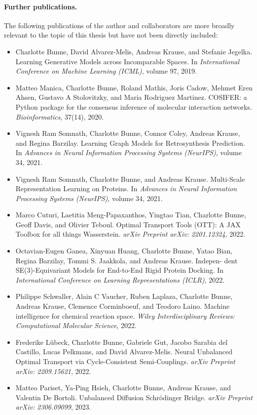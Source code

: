 \paragraph{Further publications.}
The following publications of the author and collaborators are more broadly relevant to the topic of this thesis but have not been directly included:

\begin{itemize}
	\item[] Charlotte Bunne, David Alvarez-Melis, Andreas Krause, and Stefanie Jegelka. Learning Generative Models across Incomparable Spaces. In \textit{International Conference on Machine Learning (ICML)}, volume 97, 2019.
\end{itemize}
\newpage
\begin{itemize}
	\item[] Matteo Manica, Charlotte Bunne, Roland Mathis, Joris Cadow, Mehmet Eren Ahsen, Gustavo A Stolovitzky, and Maria Rodriguez Martinez. COSIFER: a Python package for the consensus inference of molecular interaction networks. \textit{Bioinformatics}, 37(14), 2020.
	\item[] Vignesh Ram Somnath, Charlotte Bunne, Connor Coley, Andreas Krause, and Regina Barzilay. Learning Graph Models for Retrosynthesis Prediction. In \textit{Advances in Neural Information Processing Systems (NeurIPS)}, volume 34, 2021.
	\item[] Vignesh Ram Somnath, Charlotte Bunne, and Andreas Krause. Multi-Scale Representation Learning on Proteins. In \textit{Advances in Neural Information Processing Systems (NeurIPS)}, volume 34, 2021.
	\item[] Marco Cuturi, Laetitia Meng-Papaxanthos, Yingtao Tian, Charlotte Bunne, Geoff Davis, and Olivier Teboul. Optimal Transport Tools (OTT): A JAX Toolbox for all things Wasserstein. \textit{arXiv Preprint arXiv: 2201.12324}, 2022.
	\item[] Octavian-Eugen Ganea, Xinyuan Huang, Charlotte Bunne, Yatao Bian, Regina Barzilay, Tommi S. Jaakkola, and Andreas Krause. Indepen- dent SE(3)-Equivariant Models for End-to-End Rigid Protein Docking. In \textit{International Conference on Learning Representations (ICLR)}, 2022.
	\item[] Philippe Schwaller, Alain C Vaucher, Ruben Laplaza, Charlotte Bunne, Andreas Krause, Clemence Corminboeuf, and Teodoro Laino. Machine intelligence for chemical reaction space. \textit{Wiley Interdisciplinary Reviews: Computational Molecular Science}, 2022.
	\item[] Frederike L{\"u}beck, Charlotte Bunne, Gabriele Gut, Jacobo Sarabia del Castillo, Lucas Pelkmans, and David Alvarez-Melis. Neural Unbalanced Optimal Transport via Cycle-Consistent Semi-Couplings. \textit{arXiv Preprint arXiv: 2209.15621}, 2022.
	\item[] Matteo Pariset, Ya-Ping Hsieh, Charlotte Bunne, Andreas Krause, and Valentin De Bortoli. Unbalanced Diffusion Schr{\"o}dinger Bridge. \textit{arXiv Preprint arXiv: 2306.09099}, 2023.
\end{itemize}


